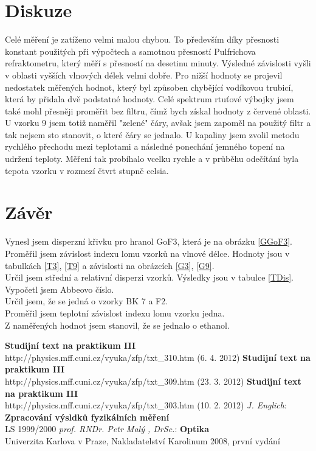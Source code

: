 \documentclass[a4paper,12pt]{article}
\begin{document}
\section{Diskuze}
Celé měření je zatíženo velmi malou chybou. To především díky přesnosti konstant použitých při výpočtech a samotnou přesností Pulfrichova refraktometru, který měří 
s přesností na desetinu minuty. Výsledné závislosti vyšli v oblasti vyšších vlnových délek velmi dobře. Pro nižší hodnoty se projevil nedostatek měřených hodnot, 
který byl způsoben chybějící vodíkovou trubicí, která by přidala dvě podstatné hodnoty. Celé spektrum rtuťové výbojky jsem také mohl přesněji proměřit bez filtru, 
čímž bych získal hodnoty z červené oblasti. U vzorku 9 jsem totiž naměřil "zelené" čáry, avšak jsem zapoměl na použitý filtr a tak nejsem sto stanovit, o které čáry se jednalo.
U kapaliny jsem zvolil metodu rychlého přechodu mezi teplotami a následné ponechání jemného topení na udržení teploty. Měření tak probíhalo vcelku rychle a v průběhu 
odečítání byla tepota vzorku v rozmezí čtvrt stupně celsia.

\section{Závěr}
Vynesl jsem disperzní křivku pro hranol GoF3, která je na obrázku \ref{GGoF3}. \\
Proměřil jsem závislost indexu lomu vzorků na vlnové délce. Hodnoty jsou v tabulkách \ref{T3}, \ref{T9} a závislosti na obrázcích \ref{G3}, \ref{G9}.\\
Určil jsem střední a relativní disperzi vzorků. Výsledky jsou v tabulce \ref{TDis}. Vypočetl jsem Abbeovo číslo.\\
Určil jsem, že se jedná o vzorky BK 7 a F2. \\
Proměřil jsem teplotní závislost indexu lomu vzorku jedna. \\
Z naměřených hodnot jsem stanovil, že se jednalo o ethanol.


\begin{thebibliography}{5}
	 \textbf{Studijní text na praktikum III} \\http://physics.mff.cuni.cz/vyuka/zfp/txt\_310.htm (6. 4. 2012)
	 \textbf{Studijní text na praktikum III} \\http://physics.mff.cuni.cz/vyuka/zfp/txt\_309.htm (23. 3. 2012)
	 \textbf{Studijní text na praktikum III} \\http://physics.mff.cuni.cz/vyuka/zfp/txt\_303.htm (10. 2. 2012)
     \emph{J. Englich}: \textbf{Zpracování výsldků fyzikálních měření} \\ LS 1999/2000
     \emph{prof. RNDr. Petr Malý , DrSc.}: \textbf{Optika}\\Univerzita Karlova v Praze, Nakladatelství Karolinum 2008, první vydání
\end{thebibliography}
\end{document}
